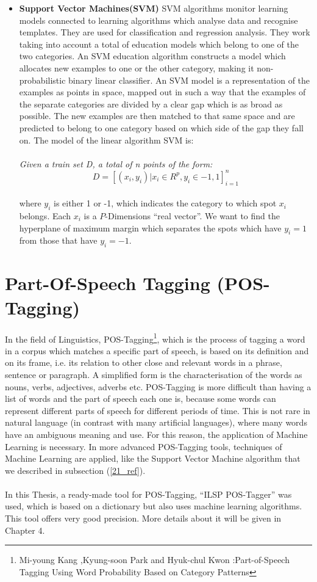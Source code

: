 \begin{itemize}
	\item \textbf{Support Vector Machines(SVM)} SVM algorithms monitor learning models connected to learning algorithms which analyse data and recognise templates. They are used for classification and regression analysis. They work taking into account a total of education models which belong to one of the two categories. An SVM education algorithm constructs a model which allocates new examples to one or the other category, making it non-probabilistic binary linear classifier. An SVM model is a representation of the examples as points in space, mapped out in such a way that the examples of the separate categories are divided by a clear gap which is as broad as possible. The new examples are then matched to that same space and are predicted to belong to one category based on which side of the gap they fall on. The model of the linear algorithm  SVM is:\\
\\
\textit{Given a train set D, a total of n points of the form:}
\\
\begin{equation}
D=\left[(x_{i},y_{i})|x_{i}\in R^{p},y_{i}\in{-1,1}\right]_{i=1}^{n}
\end{equation}
\\
where $y_{i}$ is either 1 or -1, which indicates the category to which spot $x_{i}$ belongs. Each $x_{i}$ is a $P$-Dimensions ``real vector''. We want to find the hyperplane of maximum margin which separates the spots which have $y_{i}=1$ from those that have $y_{i}=-1$.

\end{itemize}
\section{Part-Of-Speech Tagging (POS-Tagging)}\label{22_ref}
In the field of Linguistics, POS-Tagging\footnote{Mi-young Kang ,Kyung-soon Park and Hyuk-chul Kwon :Part-of-Speech Tagging Using Word Probability Based on Category Patterns}, which is the process of tagging a word in a corpus which matches a specific part of speech, is based  on its definition and on its frame, i.e. its relation to other close and relevant words in a phrase, sentence or paragraph. A simplified form is the characterisation of the words as nouns, verbs, adjectives, adverbs etc. POS-Tagging is more difficult than having a list of words and the part of speech each one is, because some words can represent different parts of speech for different periods of time. This is not rare in natural language (in contrast with many artificial languages), where many words have an ambiguous meaning and use. For this reason, the application of Machine Learning is necessary. In more advanced POS-Tagging tools, techniques of Machine Learning are applied, like the Support Vector Machine algorithm that we described in subsection (\ref{21_ref}).\\
\\
In this Thesis, a ready-made tool for POS-Tagging, ``ILSP POS-Tagger'' was used, which is based on a dictionary but also uses machine learning algorithms. This tool offers very good precision. More details about it will be given in Chapter 4.

